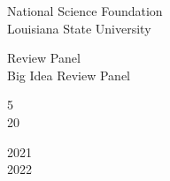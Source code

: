 \documentclass[10pt]{designcv}
\begin{document}

\clearpage


\begin{minipage}[t]{0.35\textwidth}
National Science Foundation\\
Louisiana State University\\
\end{minipage}
\hfill
\begin{minipage}[t]{0.3\textwidth}
Review Panel\\
Big Idea Review Panel\\
\end{minipage}
\hfill
\begin{minipage}[t]{0.1\textwidth}
5\\
20\\
\end{minipage}
\hfill
\begin{minipage}[t]{0.15\textwidth}
2021\\
2022\\
\end{minipage}



\end{document}
